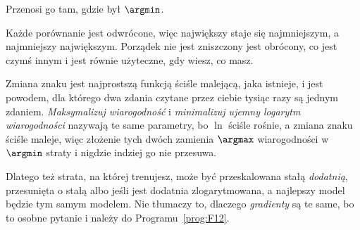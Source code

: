 \begin{fr}
\begin{ansblock}
Przenosi go tam, gdzie był $\argmin$.
\end{ansblock}

Każde porównanie jest odwrócone, więc największy staje się najmniejszym, a
najmniejszy największym. Porządek nie jest zniszczony \dash{} jest obrócony, co
jest czymś innym i jest równie użyteczne, gdy wiesz, co masz.

\begin{aibox}
Zmiana znaku jest najprostszą funkcją ściśle malejącą, jaka istnieje, i jest
powodem, dla którego dwa zdania czytane przez ciebie tysiąc razy są jednym
zdaniem. \emph{Maksymalizuj wiarogodność} i \emph{minimalizuj ujemny logarytm
wiarogodności} nazywają te same parametry, bo $\ln$ ściśle rośnie, a zmiana
znaku ściśle maleje, więc złożenie tych dwóch zamienia $\argmax$ wiarogodności
w $\argmin$ straty i nigdzie indziej go nie przesuwa.

Dlatego też strata, na której trenujesz, może być przeskalowana stałą
\emph{dodatnią}, przesunięta o stałą albo \dash{} jeśli jest dodatnia \dash{}
zlogarytmowana, a najlepszy model będzie tym samym modelem. Nie
tłumaczy to, dlaczego \emph{gradienty} są te same, bo to osobne pytanie i
należy do Programu~\ref{prog:F12}.
\end{aibox}
\end{fr}


